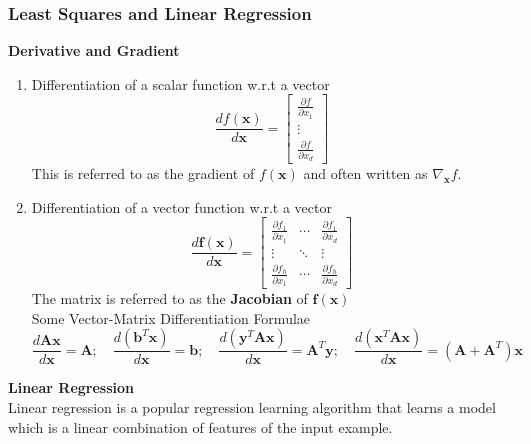 \documentclass{article}
\begin{document}
\subsubsection{Least Squares and Linear Regression}
\textbf{Derivative and Gradient}
\begin{enumerate}
    \item Differentiation of a scalar function w.r.t a vector
    \[\frac{d f(\mathbf{x})}{d \mathbf{x}} =\begin{bmatrix}\frac{\partial f}{\partial x_1} \\\vdots \\\frac{\partial f}{\partial x_d}\end{bmatrix}\]
    This is referred to as the gradient of $f(\mathbf{x})$ and often written as $\nabla_{\mathbf{x}}f$.
    \item Differentiation of a vector function w.r.t a vector
    \[\frac{d \mathbf{f}(\mathbf{x})}{d \mathbf{x}} =
    \begin{bmatrix}
    \frac{\partial f_1}{\partial x_1} & \cdots & \frac{\partial f_1}{\partial x_d} \\
    \vdots & \ddots & \vdots \\
    \frac{\partial f_h}{\partial x_1} & \cdots & \frac{\partial f_h}{\partial x_d}
    \end{bmatrix}\]
    The matrix is referred to as the \textbf{Jacobian} of $\mathbf{f(x)}$ \\
    Some Vector-Matrix Differentiation Formulae \\
    \[\frac{d\mathbf{Ax}}{d\mathbf{x}}=\mathbf{A}; \quad \frac{d(\mathbf{b}^T\mathbf{x})}{d\mathbf{x}}=\mathbf{b};\quad \frac{d(\mathbf{y}^T\mathbf{Ax})}{d\mathbf{x}}=\mathbf{A}^T\mathbf{y};\quad \frac{d(\mathbf{x}^T\mathbf{Ax})}{d\mathbf{x}}=(\mathbf{A}+\mathbf{A}^T)\mathbf{x}\]
\end{enumerate}
\textbf{Linear Regression} \\
Linear regression is a popular regression learning algorithm that learns a model which is a linear combination of features of the input example.
\end{document}
